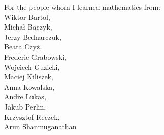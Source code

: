 \thispagestyle{empty}
\vspace*{3.5cm}
\begin{flushright}

{\large For the people whom I learned mathematics from:\\
	Wiktor Bartol,\\
	Michał Bączyk,\\
	Jerzy Bednarczuk,\\
	Beata Czyż,\\
	Frederic Grabowski,\\
	Wojciech Guzicki,\\
	Maciej Kiliszek,\\
	Anna Kowalska,\\
	Andre Lukas,\\
	Jakub Perlin,\\
	Krzysztof Reczek,\\
	Arun Shanmuganathan
}

\end{flushright}



